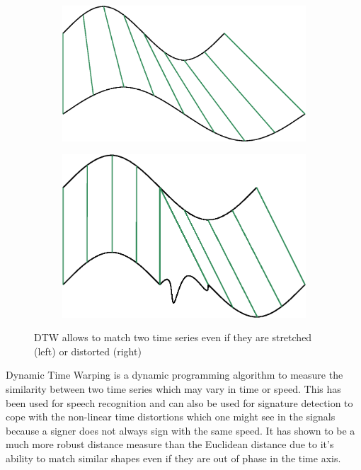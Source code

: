 \documentclass[a4paper, oneside]{csthesis}
\begin{document}
\begin{figure}
        \centering
        \begin{subfigure}[b]{0.45\textwidth}
                \centering
                \includegraphics[width=\textwidth]{figures/dtw-stretch.eps}
                \label{fig:hmm1}
        \end{subfigure}%
        \quad
        \begin{subfigure}[b]{0.45\textwidth}
                \centering
                \includegraphics[width=\textwidth]{figures/dtw-distort.eps}
                \label{fig:hmm1}
        \end{subfigure}%

        \caption{DTW allows to match two time series even if they are stretched (left) or distorted (right) }
        \label{fig:dtw-model}
\end{figure}



Dynamic Time Warping is a dynamic programming algorithm to measure the similarity between two time series which may vary in time or speed. This has been used for speech recognition and can also be used for signature detection to cope with the non-linear time distortions which one might see in the signals because a signer does not always sign with the same speed. It has shown to be a much more robust distance measure than the Euclidean distance \cite{Keogh:2000:SUD:347090.347153}\cite{1030918}\cite{1227706} due to it's ability to match similar shapes even if they are out of phase in the time axis.
\end{document}
